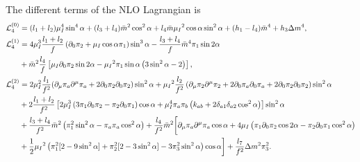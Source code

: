 The different terms of the NLO Lagrangian is
\begingroup
\allowdisplaybreaks 
%
\begin{align}
    \Ell_4^{(0)} & =
    (l_1 + l_2)\mu_I^4 \sin^4{\alpha}
    + (l_3 + l_4)\bar m^2 \cos^2{\alpha}
    + l_4 \bar m \mu_I{}^2 \cos{\alpha} \sin^2{\alpha}
    + (h_1 - l_4)\bar m^4
    + h_3 \Delta m^4,
    \label{NLO-L0}
    \\
    \nonumber
    \Ell_4^{(1)} & =
    4 \mu_I^3 \frac{l_1 + l_2}{f}
    \left(
        \partial_0 \pi_2 
        + \mu_I 
        \cos{\alpha} \pi_1
    \right)\sin^3{\alpha}
    -
    \frac{l_3 + l_4}{f}
    \bar m^4
    \pi_1 \sin{2\alpha}
    \\ \label{NLO-L1}
    & 
    +
    \bar m^2
    \frac{l_4}{f}
    \left[
        \mu_I 
        \partial_0 \pi_2 \sin{2\alpha}
        - \mu_I{}^2
        \pi_1 \sin{\alpha}
        \left(3\sin^2{\alpha} - 2\right)
    \right],
    \\
    \nonumber
    \Ell_4^{(2)} & = 
    2 \mu_I^2 \frac{l_1}{f^2}
    ( 
        \partial_\mu \pi_a \partial^\mu \pi_a
        + 2 \partial_0 \pi_2 \partial_0 \pi_2    
    )
        \sin^2{\alpha}
    + \mu_I{}^2 
    \frac{ l_2}{f^2}
    \left(
        \partial_\mu \pi_2 \partial^\mu \pi_2
        + 2\partial_0 \pi_a\partial_0 \pi_a 
        + 2\partial_0 \pi_2 \partial_0 \pi_2
    \right) 
    \sin^2{\alpha}
    \\ \nonumber
    & + 
    2 \frac{l_1 + l_2}{f^2}
    \left[
        2\mu_I^3 
        \left( 3 \pi_1 \partial_0 \pi_2 - \pi_2 \partial_0 \pi_1 \right)
        \cos{\alpha}
        + \mu_I^4  \pi_a \pi_b 
            \left(k_{ab} + 2\delta_{a1}\delta_{a2}\cos^2{\alpha} \right)
    \right]\sin^2{\alpha}
    \\ \nonumber
    & +
    \frac{l_3 + l_4}{f^2}
    \bar m^2
    \left(\pi_1^2 \sin^2{\alpha} - \pi_a \pi_a \cos^2{\alpha}\right)
    +  \frac{l_4}{f^2}
    \bar m^2
    \bigg[
    \partial_\mu \pi_a \partial^\mu \pi_a \cos{\alpha}
    + 4 \mu_I 
    \left(
        \pi_1 \partial_0 \pi_2 \cos{2\alpha}
        - \pi_2 \partial_0 \pi_1\cos^2{\alpha}
    \right)
    \\
    & %
    +\frac{1}{2} \mu_I{}^2
    \left(                
        \pi_1^2[2 - 9 \sin^2{\alpha}]
        + \pi_2^2 [2 - 3 \sin^2{\alpha}]
        - 3\pi_3^2\sin^2{\alpha}
    \right)
    \cos{\alpha}
    \bigg]
    + \frac{l_7}{f^2}
    \Delta m^2 \pi_3^2.
    \label{NLO-L2}
\end{align}
%
\endgroup

